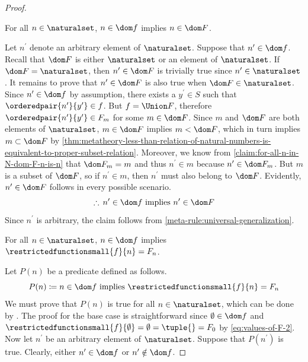 \begin{proof}
    \begin{claim}
         \label{claim:for-all-n-in-N-if-n-in-dom-f-then-n-must-also-be-in-dom-F}
        For all \( n \in \naturalset \), \( n \in \dom f \) implies \( n \in \dom F \).
    \end{claim}
    \noindent
    Let \( n^{\prime} \) denote an arbitrary element of \( \naturalset \).
    Suppose that \( n^{\prime} \in \dom f \).
    Recall that \( \dom F \) is either \( \naturalset \) or an element of \( \naturalset \).
    If \( \dom F = \naturalset \), then \( n^{\prime} \in \dom F \) is trivially true since \( n^{\prime} \in \naturalset \).
    It remains to prove that \( n^{\prime} \in \dom F \) is also true when \( \dom F \in \naturalset \).
    Since \( n^{\prime} \in \dom f \) by assumption, there exists a \( y^{\prime} \in S \) such that \( \orderedpair{n^{\prime}}{y^{\prime}} \in f \).
    But \( f = \Union F \), therefore \( \orderedpair{n^{\prime}}{y^{\prime}} \in F_{m} \) for some \( m \in \dom F \).
    Since \( m \) and \( \dom F \) are both elements of \( \naturalset\), \( m \in \dom F \) implies \( m < \dom F \), which in turn implies \( m \subset \dom F \)
    by \cref{thm:metatheory-less-than-relation-of-natural-numbers-is-equivalent-to-proper-subset-relation}.
    Moreover, we know from \cref{claim:for-all-n-in-N-dom-F-n-is-n} that \( \dom F_{m} = m \) and thus \( n^{\prime} \in m \) because
    \( n^{\prime} \in \dom F_{m} \).
    But \( m \) is a subset of \( \dom F \), so if \( n^{\prime} \in m \), then \( n^{\prime} \) must also belong to \( \dom F \).
    Evidently, \( n^{\prime} \in \dom F \) follows in every possible scenario.
    \begin{equation*}
        \therefore \, n^{\prime} \in \dom f \ \text{implies} \ n^{\prime} \in \dom F
    \end{equation*}
    Since \( n^{\prime} \) is arbitrary, the claim follows from \cref{meta-rule:universal-generalization}.

    \begin{claim}
         \label{claim:for-all-n-in-dom-f-f-restricted-to-n-equals-the-value-of-F-at-n}
        For all \( n \in \naturalset \), \( n \in \dom f \) implies \( \restrictedfunctionsmall{f}{n} = F_{n} \).
    \end{claim}
    \noindent
    Let \( P(n) \) be a predicate defined as follows.
    \begin{equation*}
        P(n) \coloneq n \in \dom f \ \text{implies} \ \restrictedfunctionsmall{f}{n} = F_{n}
    \end{equation*}
    We must prove that \( P(n) \) is true for all \( n \in \naturalset \), which can be done by .
    The proof for the base case is straightforward since \( \emptyset \in \dom f \) and \( \restrictedfunctionsmall{f}{\emptyset} = \emptyset = \tuple{} = F_{0} \)
    by \eqref{eq:values-of-F-2}.
    Now let \( n^{\prime} \) be an arbitrary element of \( \naturalset \).
    Suppose that \( P(n^{\prime}) \) is true.
    Clearly, either \( n^{\prime} \in \dom f \) or \( n^{\prime} \notin \dom f \).


\end{proof}
